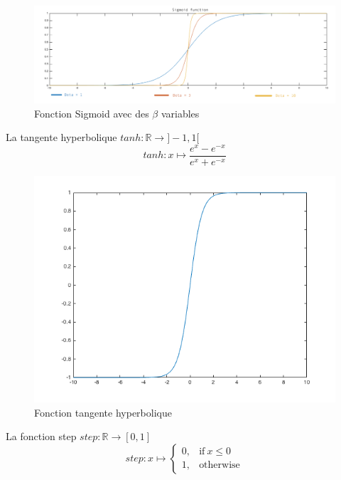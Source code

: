 \documentclass{article}
\begin{document}
\begin{figure}[H]
\begin{center}
	\includegraphics[scale=0.4]{sigmoid.png} 
	\caption{Fonction Sigmoid avec des $\beta$ variables}
\end{center}
\end{figure}

La tangente hyperbolique $tanh : \mathbb{R} \rightarrow ]-1, 1[$
\begin{equation}
	tanh : x \mapsto \frac{e^x - e^{-x}}{e^x + e^{-x}}
\end{equation}

\begin{figure}[H]
\begin{center}
	\includegraphics[scale=0.4]{tanh.png} 
	\caption{Fonction tangente hyperbolique}
\end{center}
\end{figure}

La fonction step $step : \mathbb{R} \rightarrow [0, 1]$
\begin{equation}
	step : x \mapsto
		\begin{cases}
			0, & \text{if}\ x \leq 0\\
			1, & \text{otherwise}
		\end{cases}
\end{equation}
\end{document}
